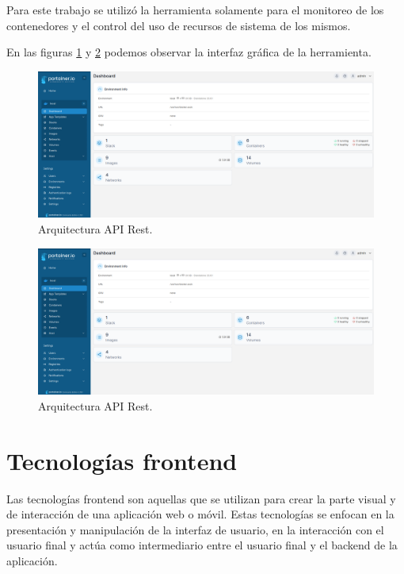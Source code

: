 Para este trabajo se utilizó la herramienta solamente para el monitoreo de los contenedores y el control del uso de recursos de sistema de los mismos.

En las figuras \ref{fig:portainer1} y \ref{fig:portainer2} podemos observar la interfaz gráfica de la herramienta.

\begin{figure}[H]
	\centering
	\includegraphics[scale=.20]{./Figures/portainer-admin-1.png}
	\caption{Arquitectura API Rest.}
	\label{fig:portainer1}
\end{figure}

\begin{figure}[H]
	\centering
	\includegraphics[scale=.20]{./Figures/portainer-admin-1.png}
	\caption{Arquitectura API Rest.}
	\label{fig:portainer2}
\end{figure}


\section{Tecnologías frontend}
\label{sec:frontend}

Las tecnologías frontend son aquellas que se utilizan para crear la parte visual y de interacción de una aplicación web o móvil. Estas tecnologías se enfocan en la presentación y manipulación de la interfaz de usuario, en la interacción con el usuario final y actúa como intermediario entre el usuario final y el backend de la aplicación.

